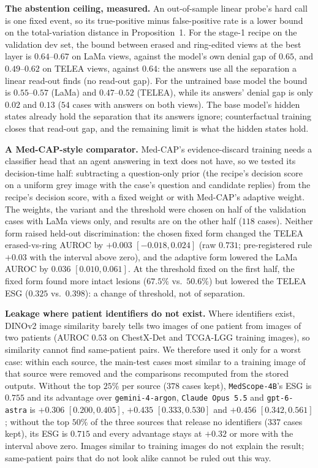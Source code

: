 \documentclass[5p,times,twocolumn,authoryear]{elsarticle}
\begin{document}
\textbf{The abstention ceiling, measured.} An out-of-sample linear probe's hard call is one fixed event, so its true-positive minus false-positive rate is a lower bound on the total-variation distance in Proposition~1. For the stage-1 recipe on the validation dev set, the bound between erased and ring-edited views at the best layer is $0.64$--$0.67$ on LaMa views, against the model's own denial gap of $0.65$, and $0.49$--$0.62$ on TELEA views, against $0.64$: the answers use all the separation a linear read-out finds (no read-out gap). For the untrained base model the bound is $0.55$--$0.57$ (LaMa) and $0.47$--$0.52$ (TELEA), while its answers' denial gap is only $0.02$ and $0.13$ ($54$ cases with answers on both views). The base model's hidden states already hold the separation that its answers ignore; counterfactual training closes that read-out gap, and the remaining limit is what the hidden states hold.

\textbf{A Med-CAP-style comparator.} Med-CAP's evidence-discard training needs a classifier head that an agent answering in text does not have, so we tested its decision-time half: subtracting a question-only prior (the recipe's decision score on a uniform grey image with the case's question and candidate replies) from the recipe's decision score, with a fixed weight or with Med-CAP's adaptive weight. The weights, the variant and the threshold were chosen on half of the validation cases with LaMa views only, and results are on the other half ($118$ cases). Neither form raised held-out discrimination: the chosen fixed form changed the TELEA erased-vs-ring AUROC by $+0.003$ $[-0.018, 0.024]$ (raw $0.731$; pre-registered rule $+0.03$ with the interval above zero), and the adaptive form lowered the LaMa AUROC by $0.036$ $[0.010, 0.061]$. At the threshold fixed on the first half, the fixed form found more intact lesions ($67.5\%$ vs.\ $50.6\%$) but lowered the TELEA ESG ($0.325$ vs.\ $0.398$): a change of threshold, not of separation.

\textbf{Leakage where patient identifiers do not exist.} Where identifiers exist, DINOv2 image similarity barely tells two images of one patient from images of two patients (AUROC $0.53$ on ChestX-Det and TCGA-LGG training images), so similarity cannot find same-patient pairs. We therefore used it only for a worst case: within each source, the main-test cases most similar to a training image of that source were removed and the comparisons recomputed from the stored outputs. Without the top $25\%$ per source ($378$ cases kept), \texttt{MedScope-4B}'s ESG is $0.755$ and its advantage over \texttt{gemini-4-argon}, \texttt{Claude Opus 5.5} and \texttt{gpt-6-astra} is $+0.306$ $[0.200, 0.405]$, $+0.435$ $[0.333, 0.530]$ and $+0.456$ $[0.342, 0.561]$; without the top $50\%$ of the three sources that release no identifiers ($337$ cases kept), its ESG is $0.715$ and every advantage stays at $+0.32$ or more with the interval above zero. Images similar to training images do not explain the result; same-patient pairs that do not look alike cannot be ruled out this way.
\end{document}
